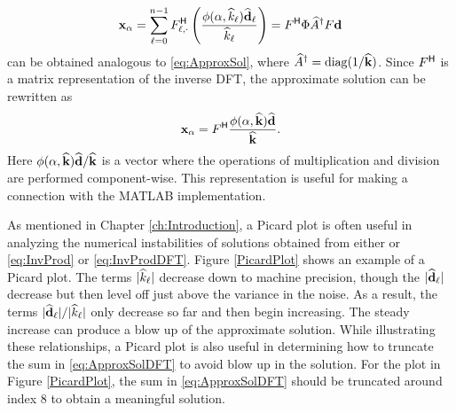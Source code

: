 \begin{equation}
\mathbf{x}_\alpha = \sum_{\ell = 0}^{n-1} {F}^\mathsf{H}_{\ell,\cdot}\left(\frac{\phi(\alpha,\widehat{k}_\ell)\widehat{\mathbf{d}}_\ell}{\widehat{k}_\ell}\right) = {F}^\mathsf{H}\Phi\widehat{A}^\dagger F\mathbf{d}
\label{eq:ApproxSolDFT}
\end{equation}
can be obtained analogous to \eqref{eq:ApproxSol}, where $\widehat{A}^\dagger = \operatorname{diag}(1/\widehat{\mathbf{k}})$.
Since ${F}^\mathsf{H}$ is a matrix representation of the inverse DFT, the approximate solution can be rewritten as
\[\mathbf{x}_\alpha = {F}^\mathsf{H} \frac{\phi(\alpha,\widehat{\mathbf{k}})\widehat{\mathbf{d}}}{\widehat{\mathbf{k}}}.\]
Here $\phi(\alpha,\widehat{\mathbf{k}})\widehat{\mathbf{d}}/{\widehat{\mathbf{k}}}$ is a vector where the operations of multiplication and division are performed component-wise. This representation is useful for making a connection with the MATLAB implementation. \par
As mentioned in Chapter \ref{ch:Introduction}, a Picard plot is often useful in analyzing the numerical instabilities of solutions obtained from either or \eqref{eq:InvProd} or \eqref{eq:InvProdDFT}. Figure \ref{PicardPlot} shows an example of a Picard plot. The terms $|\widehat{k}_\ell|$ decrease down to machine precision, though the $|\widehat{\mathbf{d}}_\ell|$ decrease but then level off just above the variance in the noise. As a result, the terms $|\widehat{\mathbf{d}}_\ell|/|\widehat{k}_\ell|$ only decrease so far and then begin increasing. The steady increase can produce a blow up of the approximate solution. While illustrating these relationships, a Picard plot is also useful in determining how to truncate the sum in \eqref{eq:ApproxSolDFT} to avoid blow up in the solution. For the plot in Figure \ref{PicardPlot}, the sum in \eqref{eq:ApproxSolDFT} should be truncated around index 8 to obtain a meaningful solution. \par 

